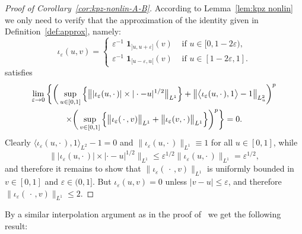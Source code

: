 \documentclass[10pt]{amsart}
\theoremstyle{definition}\newtheorem{defi}[theo]{Definition}\newtheorem{rema}[theo]{Remark}\newtheorem{exam}[theo]{Example}\newtheorem{exem}[theo]{Example}\newtheorem{nota}[theo]{Notation}
\renewcommand{\le}{\leqslant}
\begin{document}
\begin{proof}[Proof of Corollary~\ref{cor:kpz-nonlin-A-B}]
According to Lemma~\ref{lem:kpz nonlin} we only need to verify that the approximation of the identity given in Definition~\ref{def:approx}, namely:
\[
\iota_\varepsilon(u, v)=
\begin{cases} \varepsilon^{-1} \; \mathbf{1}_{]u,u+\varepsilon]}(v) & \text{ if } u \in [0, 1 - 2
\varepsilon), \\
\varepsilon^{-1}\; \mathbf{1}_{[u-\varepsilon,u[}(v) & \text{ if } u \in [1 - 2
\varepsilon, 1].
\end{cases}
\]
satisfies
\begin{multline*}
\lim_{\varepsilon \to 0}\bigg\{ \bigg(\sup_{u\in[0,1]} \Big\{\big\| | \iota_\varepsilon (u, \cdot\,) | \times | \cdot - u |^{1/2} \big\|_{L^1}\Big\} + \big\| \big\langle \iota_\varepsilon (u, \cdot\,), 1 \big\rangle - 1 \big\|_{L^2_u}
\bigg)^p \vphantom{\int_0^t}\\
\times \bigg(\sup_{v\in[0,1]} \Big\{ \big\| \iota_\varepsilon (\,\cdot\,, v) \big\|_{L^1} + \big\| \iota_\varepsilon (v, \cdot\,)
\big\|_{L^1} \Big\}\bigg)^p \bigg\} = 0.
\end{multline*}
Clearly $\langle \iota_\varepsilon (u, \cdot\,), 1 \rangle_{L^2} - 1 = 0$ and $\| \iota_\varepsilon (u, \cdot\,)\|_{L^1} \equiv 1$ for all $u \in [0,1]$, while
\[
\big\| | \iota_\varepsilon (u, \cdot\,) | \times | \cdot - u |^{1/2} \big\|_{L^1} \le \varepsilon^{1/2} \big\| \iota_\varepsilon (u, \cdot\,) \big\|_{L^1} = \varepsilon^{1/2},
\]
and therefore it remains to show that $\| \iota_\varepsilon (\,\cdot\,, v) \|_{L^1}$ is uniformly bounded in $v \in [0,1]$ and $\varepsilon \in (0,1]$. But $\iota_\varepsilon(u,v) = 0$ unless $|v - u| \le \varepsilon$, and therefore $\| \iota_\varepsilon (\,\cdot\,, v) \|_{L^1} \le 2$.
\end{proof}

By a similar interpolation argument as in the proof of~\cite[Corollary~3.17]{Gubinelli2015Energy} we get the following result:
\end{document}
